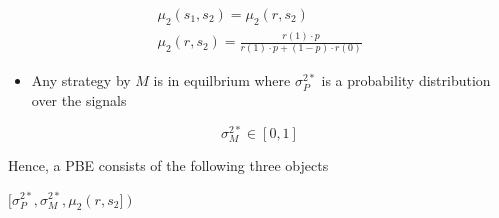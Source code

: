 \documentclass[
  12pt,
]{article}
\providecommand{\tightlist}{%
  \setlength{\itemsep}{0pt}\setlength{\parskip}{0pt}}\usepackage{longtable,booktabs,array}
\theoremstyle{plain}
\theoremstyle{plain}
\theoremstyle{remark}
\begin{document}
\[
\begin{aligned}
\mu_2(s_1, s_2) =  \mu_2(r, s_2)\\
\mu_2(r, s_2) =  \frac{r(1) \cdot p}{r(1) \cdot p + (1 - p) \cdot r(0)}
\end{aligned}
\]

\begin{itemize}
\tightlist
\item
  Any strategy by \(M\) is in equilbrium where \(\sigma_P^{2*}\) is a
  probability distribution over the signals
\end{itemize}

\[
\sigma_M^{2*} \in [0, 1]
\]

Hence, a PBE consists of the following three objects

\([\sigma_P^{2*}, \sigma_M^{2*},  \mu_2(r, s_2])\)
\end{document}
